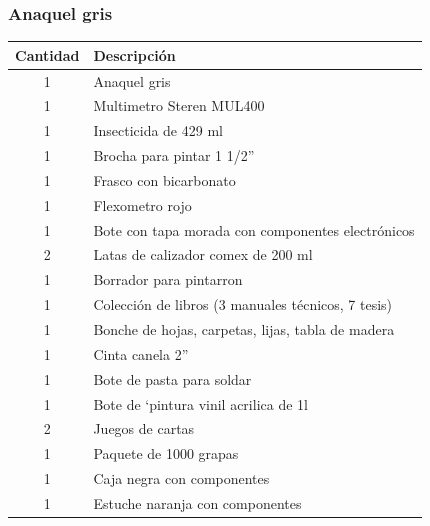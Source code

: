 \documentclass[a4paper,11pt]{article}                 %
\begin{document}
  \subsubsection*{Anaquel gris}
    \begin{table}[H]
    \centering
    \begin{tabular}{|c|l|}
    \hline
    Cantidad & Descripción                                        \\ \hline
    1        & Anaquel gris                                       \\ \hline
    1        & Multimetro Steren MUL400                           \\ \hline
    1        & Insecticida de 429 ml                              \\ \hline
    1        & Brocha para pintar 1 1/2”                          \\ \hline
    1        & Frasco con bicarbonato                             \\ \hline
    1        & Flexometro rojo                                    \\ \hline
    1        & Bote con tapa morada con componentes electrónicos  \\ \hline
    2        & Latas de calizador comex de 200 ml                 \\ \hline
    1        & Borrador para pintarron                            \\ \hline
    1        & Colección de libros (3 manuales técnicos, 7 tesis) \\ \hline
    1        & Bonche de hojas, carpetas, lijas, tabla de madera  \\ \hline
    1        & Cinta canela 2”                                    \\ \hline
    1        & Bote de pasta para soldar                          \\ \hline
    1        & Bote de `pintura vinil acrilica de 1l              \\ \hline
    2        & Juegos de cartas                                   \\ \hline
    1        & Paquete de 1000 grapas                             \\ \hline
    1        & Caja negra con componentes                         \\ \hline
    1        & Estuche naranja con componentes                    \\ \hline

\end{tabular}
\end{table}
\end{document}
